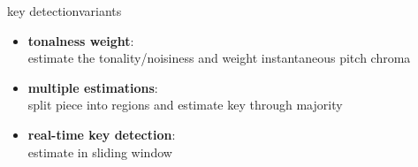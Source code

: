         \begin{frame}{key detection}{variants}
            \begin{itemize}
                \item	\textbf{tonalness weight}:\\ estimate the tonality/noisiness and weight instantaneous pitch chroma
                \item<2->	\textbf{multiple estimations}:\\ split piece into regions and estimate key through majority
                \item<3->	\textbf{real-time key detection}:\\ estimate in sliding window
            \end{itemize}
        \end{frame}
